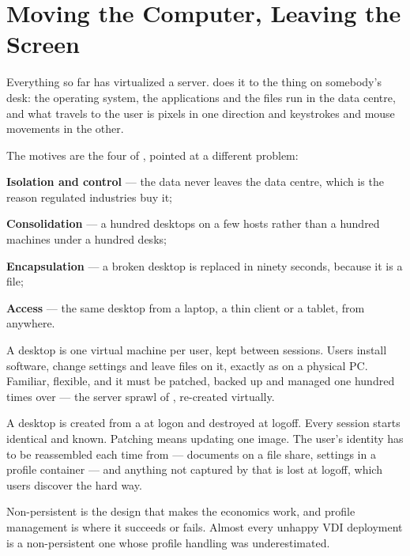 \section{Moving the Computer, Leaving the Screen}

Everything so far has virtualized a server.  does it to the thing on somebody's desk: the operating system,
the applications and the files run in the data centre, and what travels to the
user is pixels in one direction and keystrokes and mouse movements in the
other.

The motives are the four of , pointed at a different problem:

\begin{tight}
  \item \textbf{Isolation and control} --- the data never leaves the data
        centre, which is the reason regulated industries buy it;
  \item \textbf{Consolidation} --- a hundred desktops on a few hosts rather
        than a hundred machines under a hundred desks;
  \item \textbf{Encapsulation} --- a broken desktop is replaced in ninety
        seconds, because it is a file;
  \item \textbf{Access} --- the same desktop from a laptop, a thin client or a
        tablet, from anywhere.
\end{tight}

\begin{definitionbox}
A  desktop is one virtual machine per user, kept between
sessions. Users install software, change settings and leave files on it,
exactly as on a physical PC. Familiar, flexible, and it must be patched,
backed up and managed one hundred times over --- the server sprawl of
, re-created virtually.

\smallskip
A  desktop is created from a  at logon
and destroyed at logoff. Every session starts identical and known. Patching
means updating one image. The user's identity has to be reassembled each time
from  --- documents on a file share, settings in a
profile container --- and anything not captured by that is lost at logoff,
which users discover the hard way.

\smallskip
Non-persistent is the design that makes the economics work, and profile
management is where it succeeds or fails. Almost every unhappy VDI deployment
is a non-persistent one whose profile handling was underestimated.
\end{definitionbox}

